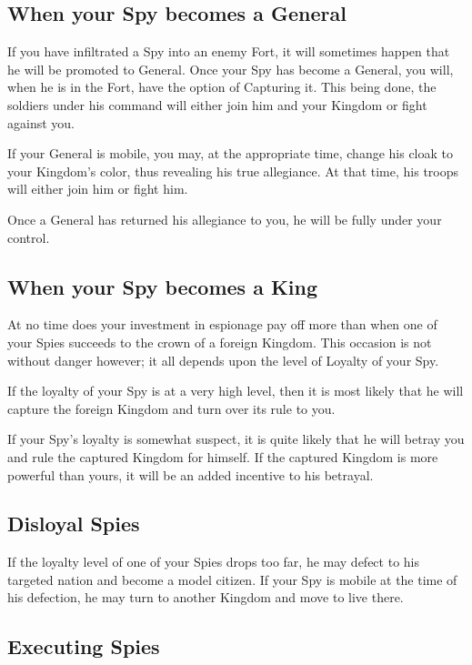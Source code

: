 \subsection{When your Spy becomes a General}

If you have infiltrated a Spy into an enemy Fort, it will sometimes happen that he will be promoted to General. Once your Spy has become a General, you will, when he is in the Fort, have the option of Capturing it. This being done, the soldiers under his command will either join him and your Kingdom or fight against you.

If your General is mobile, you may, at the appropriate time, change his cloak to your Kingdom’s color, thus revealing his true allegiance. At that time, his troops will either join him or fight him.

Once a General has returned his allegiance to you, he will be fully under your control.

\subsection{When your Spy becomes a King}

At no time does your investment in espionage pay off more than when one of your Spies succeeds to the crown of a foreign Kingdom. This occasion is not without danger however; it all depends upon the level of Loyalty of your Spy.

If the loyalty of your Spy is at a very high level, then it is most likely that he will capture the foreign Kingdom and turn over its rule to you.

If your Spy’s loyalty is somewhat suspect, it is quite likely that he will betray you and rule the captured Kingdom for himself. If the captured Kingdom is more powerful than yours, it will be an added incentive to his betrayal.

\subsection{Disloyal Spies}

If the loyalty level of one of your Spies drops too far, he may defect to his targeted nation and become a model citizen. If your Spy is mobile at the time of his defection, he may turn to another Kingdom and move to live there.

\subsection{Executing Spies}

